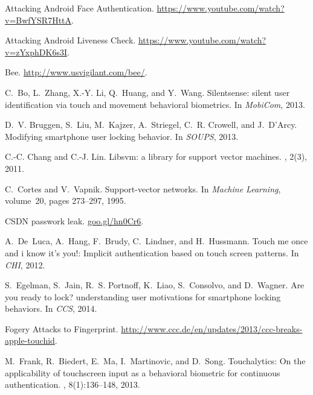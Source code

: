 \documentclass{sig-alternate-05-2015}
\begin{document}
\balance
{

\begin{thebibliography}{10}

{Attacking Android Face Authentication}.
\newblock \url{https://www.youtube.com/watch?v=BwfYSR7HttA}.

{Attacking Android Liveness Check}.
\newblock \url{https://www.youtube.com/watch?v=zYxphDK6s3I}.

{Bee}.
\newblock \url{http://www.usvigilant.com/bee/}.

C.~Bo, L.~Zhang, X.-Y. Li, Q.~Huang, and Y.~Wang.
\newblock Silentsense: silent user identification via touch and movement
  behavioral biometrics.
\newblock In {\em MobiCom}, 2013.

D.~V. Bruggen, S.~Liu, M.~Kajzer, A.~Striegel, C.~R. Crowell, and J.~D'Arcy.
\newblock Modifying smartphone user locking behavior.
\newblock In {\em SOUPS}, 2013.

C.-C. Chang and C.-J. Lin.
\newblock Libsvm: a library for support vector machines.
, 2(3), 2011.

C.~Cortes and V.~Vapnik.
\newblock Support-vector networks.
\newblock In {\em Machine Learning}, volume~20, pages 273--297, 1995.

{CSDN passwork leak}.
\newblock \url{goo.gl/hn0Cr6}.

A.~De~Luca, A.~Hang, F.~Brudy, C.~Lindner, and H.~Hussmann.
\newblock Touch me once and i know it's you!: Implicit authentication based on
  touch screen patterns.
\newblock In {\em CHI}, 2012.

S.~Egelman, S.~Jain, R.~S. Portnoff, K.~Liao, S.~Consolvo, and D.~Wagner.
\newblock Are you ready to lock? understanding user motivations for smartphone
  locking behaviors.
\newblock In {\em CCS}, 2014.

{Fogery Attacks to Fingerprint}.
\newblock \url{http://www.ccc.de/en/updates/2013/ccc-breaks-apple-touchid}.

M.~Frank, R.~Biedert, E.~Ma, I.~Martinovic, and D.~Song.
\newblock Touchalytics: On the applicability of touchscreen input as a
  behavioral biometric for continuous authentication.
,
  8(1):136--148, 2013.


\end{thebibliography}}
\end{document}
